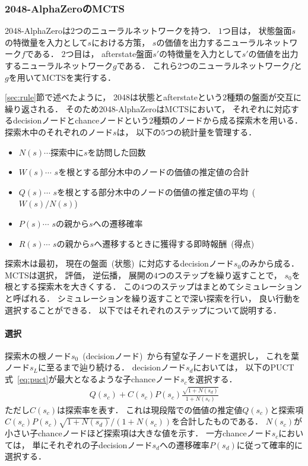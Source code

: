 \subsubsection*{2048-AlphaZeroのMCTS}
\label{subsubsec:mcts}
2048-AlphaZeroは$2$つのニューラルネットワークを持つ．
$1$つ目は， 状態盤面$s$の特徴量を入力として$s$における方策， $s$の価値を出力するニューラルネットワーク$f$である．
$2$つ目は， afterstate盤面$s'$の特徴量を入力として$s'$の価値を出力するニューラルネットワーク$g$である．
これら$2$つのニューラルネットワーク$f$と$g$を用いてMCTSを実行する．

\ref{sec:rule}節で述べたように， 2048は状態とafterstateという$2$種類の盤面が交互に繰り返される．
そのため2048-AlphaZeroはMCTSにおいて， それぞれに対応するdecisionノードとchanceノードという$2$種類のノードから成る探索木を用いる．
探索木中のそれぞれのノード$s$は， 以下の$5$つの統計量を管理する．
\begin{itemize}
  \item $N(s) \cdots$探索中に$s$を訪問した回数
  \item $W(s) \cdots$ $s$を根とする部分木中のノードの価値の推定値の合計
  \item $Q(s) \cdots$ $s$を根とする部分木中のノードの価値の推定値の平均~($W(s) / N(s)$)
  \item $P(s) \cdots$ $s$の親から$s$への遷移確率
  \item $R(s) \cdots$ $s$の親から$s$へ遷移するときに獲得する即時報酬~(得点)
\end{itemize}
探索木は最初， 現在の盤面~(状態)~に対応するdecisionノード$s_0$のみから成る．
MCTSは選択， 評価， 逆伝播， 展開の$4$つのステップを繰り返すことで， $s_0$を根とする探索木を大きくする．
この$4$つのステップはまとめてシミュレーションと呼ばれる．
シミュレーションを繰り返すことで深い探索を行い， 良い行動を選択することができる．
以下ではそれぞれのステップについて説明する．

\paragraph{選択}
探索木の根ノード$s_0$~(decisionノード)~から有望な子ノードを選択し， これを葉ノード$s_L$に至るまで辿り続ける．
decisionノード$s_d$においては， 以下のPUCT式~\ref{eq:puct}が最大となるような子chanceノード$s_c$を選択する．
\begin{align}
  Q(s_c) + C(s_c)P(s_c)\frac{\sqrt{1+N(s_d)}}{1+N(s_c)}
  \label{eq:puct}
\end{align}
ただし$C(s_c)$は探索率を表す．
これは現段階での価値の推定値$Q(s_c)$と探索項$C(s_c)P(s_c)\sqrt{1+N(s_d)}/(1 + N(s_c))$を合計したものである．
$N(s_c)$が小さい子chanceノードほど探索項は大きな値を示す．
一方chanceノード$s_c$においては， 単にそれぞれの子decisionノード$s_d$への遷移確率$P(s_d)$に従って確率的に選択する．

